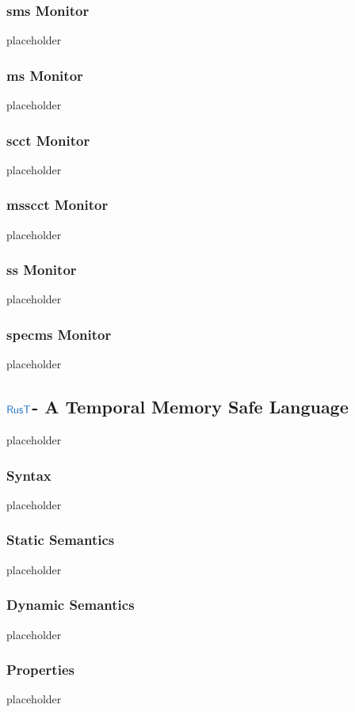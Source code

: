 \documentclass[a4paper,12pt]{article}
\begin{document}
\subsubsection{\gls*{sms} Monitor}\label{subsubsec-mon-sms}
placeholder
\subsubsection{\gls*{ms} Monitor}\label{subsubsec-mon-ms}
placeholder
\subsubsection{\gls*{scct} Monitor}\label{subsubsec-mon-scct}
placeholder
\subsubsection{\gls*{msscct} Monitor}\label{subsubsec-mon-msscct}
placeholder
\subsubsection{\gls*{ss} Monitor}\label{subsubsec-mon-spec}
placeholder
\subsubsection{\gls*{specms} Monitor}\label{subsubsec-mon-specms}
placeholder


\subsection{$\src{RusT}$- A Temporal Memory Safe Language}\label{subsec-rust}
placeholder
\subsubsection{Syntax}\label{subsec-rust-syntax}
placeholder
\subsubsection{Static Semantics}\label{subsec-rust-static}
placeholder
\subsubsection{Dynamic Semantics}\label{subsec-rust-dynamic}
placeholder
\subsubsection{Properties}\label{subsec-rust-properties}
placeholder
\end{document}
